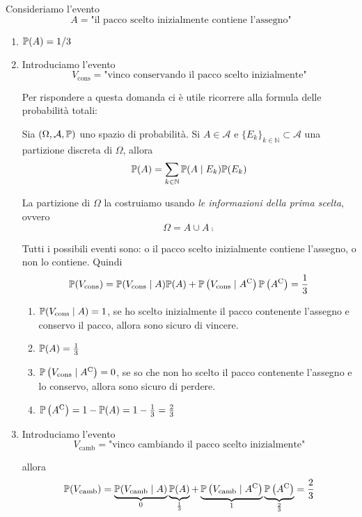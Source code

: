 Consideriamo l'evento
\begin{equation*}
A=\text{"il pacco scelto inizialmente contiene l'assegno"}
\end{equation*}
\begin{enumerate}
\item $\mathbb{P}( A) =1/3$
\item Introduciamo l'evento
\begin{equation*}
V_{\text{cons}} =\text{"vinco conservando il pacco scelto inizialmente"}
\end{equation*}

Per rispondere a questa domanda ci è utile ricorrere alla formula delle probabilità totali:\begin{theorem}
Sia $( \Omega ,\mathcal{A} ,\mathbb{P})$ uno spazio di probabilità. Si $A\in \mathcal{A}$ e $\{E_{k}\}_{k\in \mathbb{N}} \subset \mathcal{A}$ una partizione discreta di $\Omega $, allora
\begin{equation*}
\mathbb{P}( A) =\sum\limits _{k\in \mathbb{N}}\mathbb{P}( A\mid E_{k})\mathbb{P}( E_{k})
\end{equation*}
\end{theorem}

La partizione di $\Omega $ la costruiamo usando \textit{le informazioni della prima scelta}, ovvero
\begin{equation*}
\Omega =A\cup A\comp
\end{equation*}

Tutti i possibili eventi sono: o il pacco scelto inizialmente contiene l'assegno, o non lo contiene. Quindi
\begin{equation*}
\mathbb{P}( V_{\text{cons}}) =\mathbb{P}( V_{\text{cons}} \mid A)\mathbb{P}( A) +\mathbb{P}\left( V_{\text{cons}} \mid A^{\mathrm{C}}\right)\mathbb{P}\left( A^{\mathrm{C}}\right) =\frac{1}{3}
\end{equation*}
\begin{enumerate}
\item $\mathbb{P}( V_{\text{cons}} \mid A) =1$, se ho scelto inizialmente il pacco contenente l'assegno e conservo il pacco, allora sono sicuro di vincere.
\item $\mathbb{P}( A) =\frac{1}{3}$
\item $\mathbb{P}\left( V_{\text{cons}} \mid A^{\mathrm{C}}\right) =0$, se so che non ho scelto il pacco contenente l'assegno e lo conservo, allora sono sicuro di perdere.
\item $\mathbb{P}\left( A^{\mathrm{C}}\right) =1-\mathbb{P}( A) =1-\frac{1}{3} =\frac{2}{3}$
\end{enumerate}
\item Introduciamo l'evento
\begin{equation*}
V_{\text{camb}} =\text{"vinco cambiando il pacco scelto inizialmente"}
\end{equation*}

allora
\begin{equation*}
\mathbb{P}( V_{\text{camb}}) =\underbrace{\mathbb{P}( V_{\text{camb}} \mid A)}_{0}\underbrace{\mathbb{P}( A)}_{\frac{1}{3}} +\underbrace{\mathbb{P}\left( V_{\text{camb}} \mid A^{\mathrm{C}}\right)}_{1}\underbrace{\mathbb{P}\left( A^{\mathrm{C}}\right)}_{\frac{2}{3}} =\frac{2}{3}
\end{equation*}
\end{enumerate}

